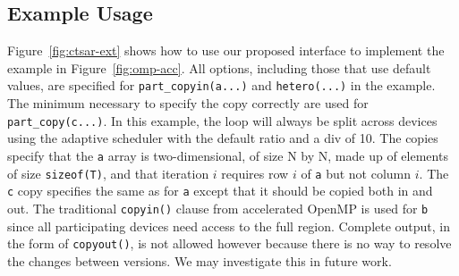 \subsection{Example Usage}


Figure~\ref{fig:ctsar-ext} shows how to use our proposed interface to
implement the example in Figure~\ref{fig:omp-acc}. All options, including
those that use default values, are specified for \verb#part_copyin(a...)# and
\verb#hetero(...)# in the example. The minimum necessary to specify the copy
correctly are used for \verb#part_copy(c...)#.  In this example, the loop will
always be split across devices using the adaptive scheduler with the default
ratio and a div of 10. The copies specify that the \verb#a# array is
two-dimensional, of size N by N, made up of elements of size \verb#sizeof(T)#,
and that iteration $i$ requires row $i$ of \verb#a# but not column $i$. The
\verb#c# copy specifies the same as for \verb#a# except that it should be
copied both in and out. The traditional \verb#copyin()# clause from
accelerated OpenMP is used for \verb#b# since all participating devices need
access to the full region.  Complete output, in the form of \verb#copyout()#,
is not allowed however because there is no way to resolve the changes between
versions.  We may investigate this in future work.

